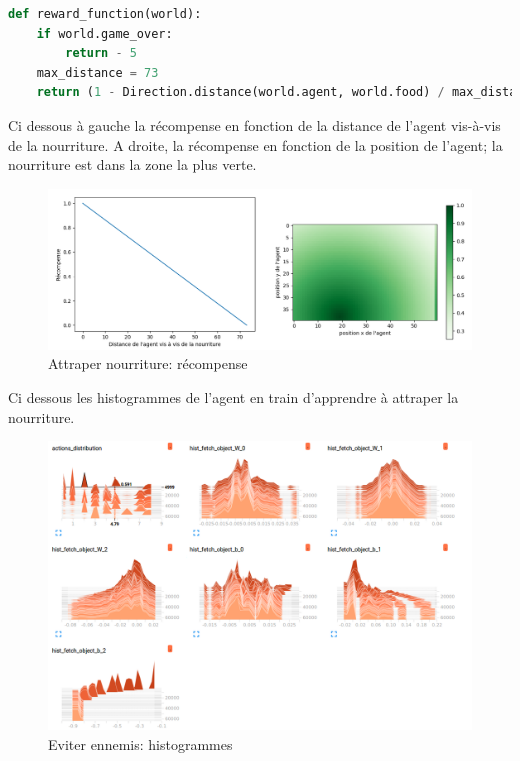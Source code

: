 \documentclass[11pt,a4paper]{report}
\begin{document}
  \begin{lstlisting}[language=python]
def reward_function(world):
    if world.game_over:
        return - 5
    max_distance = 73
    return (1 - Direction.distance(world.agent, world.food) / max_distance) 
   \end{lstlisting}  
   
  
  \par Ci dessous à gauche la récompense en fonction de la distance de l'agent vis-à-vis de la nourriture. A droite, la récompense en fonction de la position de l'agent; la nourriture est dans la zone la plus verte. 
  
     \begin{figure}[!h]
   \center
   \includegraphics[scale=0.4]{ressources/reward_function_fetch_food.png}
   \caption{Attraper nourriture: récompense}
   \end{figure} 
   
  \par Ci dessous les histogrammes de l'agent en train d'apprendre à attraper la nourriture. 
        
   \begin{figure}[!h]
   \center
   \includegraphics[scale=0.4]{ressources/reward_function_histograms_fetch_food.png}
   \caption{Eviter ennemis: histogrammes}
   \end{figure} 
   
\end{document}
